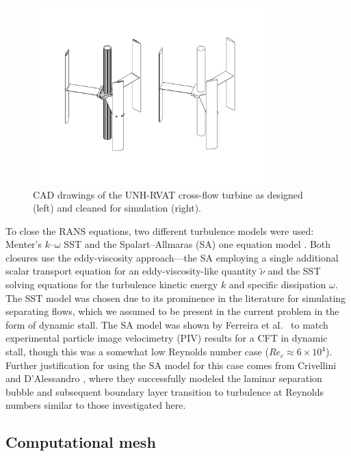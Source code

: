\documentclass[aip,graphicx]{revtex4-1}
\begin{document}
\begin{figure}
    \centering

    \includegraphics[clip, trim=0 1in 0 1in, width=0.8\textwidth]{CAD}

    \caption{CAD drawings of the UNH-RVAT cross-flow turbine as designed (left)
        and cleaned for simulation (right).}

    \label{fig:cfd-cad}
\end{figure}

To close the RANS equations, two different turbulence models were used: Menter's
$k$--$\omega$ SST \cite{Menter1994} and the Spalart--Allmaras (SA) one equation
model \cite{Spalart1992}. Both closures use the eddy-viscosity approach---the SA
employing a single additional scalar transport equation for an
eddy-viscosity-like quantity $\tilde{\nu}$ and the SST solving equations for the
turbulence kinetic energy $k$ and specific dissipation $\omega$. The SST model
was chosen due to its prominence in the literature for simulating separating
flows, which we assumed to be present in the current problem in the form of
dynamic stall. The SA model was shown by Ferreira et al.~\cite{Ferreira2007} to
match experimental particle image velocimetry (PIV) results for a CFT in dynamic
stall, though this was a somewhat low Reynolds number case ($Re_c \approx 6
\times 10^4$). Further justification for using the SA model for this case comes
from Crivellini and D'Alessandro \cite{Crivellini2014}, where they successfully
modeled the laminar separation bubble and subsequent boundary layer transition
to turbulence at Reynolds numbers similar to those investigated here.


\subsection{Computational mesh}
\end{document}
